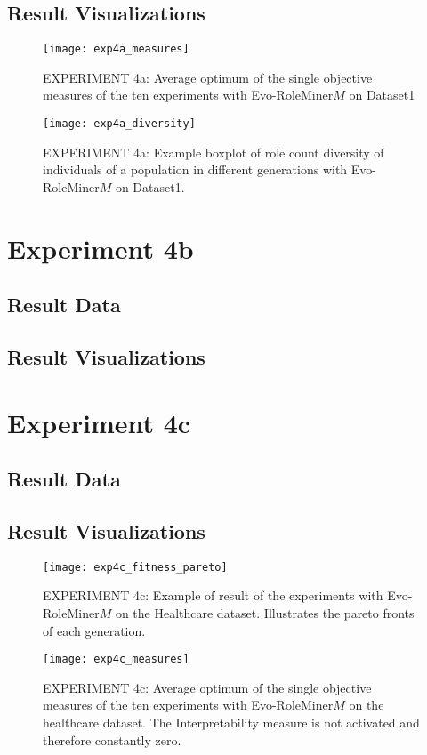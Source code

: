 	\subsection{Result Visualizations}
	\label{sec:A_Exp4a_Diagrams}
		\begin{figure}[H]
			\centering
			\texttt{[image: exp4a\_measures]}
			\caption{EXPERIMENT 4a: Average optimum of the single objective measures of the ten experiments with Evo-RoleMiner$M$ on Dataset1}
			\label{fig:exp4a_measures}
		\end{figure}
		\begin{figure}[H]
			\centering
			\texttt{[image: exp4a\_diversity]}
			\caption{EXPERIMENT 4a: Example boxplot of role count diversity of individuals of a population in different generations with Evo-RoleMiner$M$ on Dataset1.}
			\label{fig:exp4a_diversity}
		\end{figure}

\section{Experiment 4b}
\label{sec:A_Exp4b}
	\subsection{Result Data}
	\label{sec:A_Exp4b_Data}
	\subsection{Result Visualizations}
	\label{sec:A_Exp4b_Diagrams}

\section{Experiment 4c}
\label{sec:A_Exp4c}
	\subsection{Result Data}
	\label{sec:A_Exp4c_Data}
	\subsection{Result Visualizations}
	\label{sec:A_Exp4c_Diagrams}
		\begin{figure}[H]
			\centering
			\texttt{[image: exp4c\_fitness\_pareto]}
			\caption{EXPERIMENT 4c: Example of result of the experiments with Evo-RoleMiner$M$ on the Healthcare dataset. Illustrates the pareto fronts of each generation.}
			\label{fig:exp4c_fitness_pareto}
		\end{figure}
		\begin{figure}[H]
			\centering
			\texttt{[image: exp4c\_measures]}
			\caption{EXPERIMENT 4c: Average optimum of the single objective measures of the ten experiments with Evo-RoleMiner$M$ on the healthcare dataset. The Interpretability measure is not activated and therefore constantly zero.}
			\label{fig:exp4c_measures}
		\end{figure}

